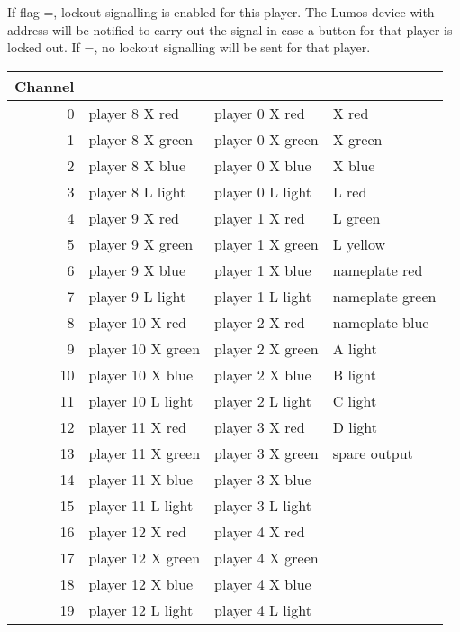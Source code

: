 \documentclass[letterpaper,twoside,onecolumn,openright,final]{memoir}
\begin{document}
\begin{QS}
	If flag =, lockout signalling is enabled for this player. The Lumos device
	with address  will be notified to carry out the signal in case a button
	for that player is locked out. If =, no lockout signalling will be sent
	for that player.

\begin{table}
	\begin{QS*}
		\begin{center}
			\begin{tabular}{rlll}\\\toprule
				\bfseries Channel &
				\bfseries \acronym{QSMC} &
				\bfseries \acronym{QSXT} &
				\bfseries \acronym{QSCC} \\\midrule
				0 & player 8 X red  & player 0 X red & X red \\
				1 & player 8 X green  & player 0 X green & X green \\
				2 & player 8 X blue  & player 0 X blue & X blue \\
				3 & player 8 L light  & player 0 L light & L red \\
				4 & player 9 X red  & player 1 X red & L green \\
				5 & player 9 X green  & player 1 X green & L yellow \\
				6 & player 9 X blue  & player 1 X blue & nameplate red \\
				7 & player 9 L light  & player 1 L light & nameplate green \\
				8 & player 10 X red  & player 2 X red & nameplate blue \\
				9 & player 10 X green  & player 2 X green & A light \\
				10& player 10 X blue  & player 2 X blue & B light \\
				11& player 10 L light  & player 2 L light & C light \\
				12& player 11 X red  & player 3 X red & D light \\
				13& player 11 X green  & player 3 X green & spare output \\
				14& player 11 X blue  & player 3 X blue \\
				15& player 11 L light  & player 3 L light \\
				16& player 12 X red  & player 4 X red \\
				17& player 12 X green  & player 4 X green \\
				18& player 12 X blue  & player 4 X blue \\
				19& player 12 L light  & player 4 L light \\

\end{tabular}
\end{center}
\end{QS*}
\end{table}
\end{QS}
\end{document}
